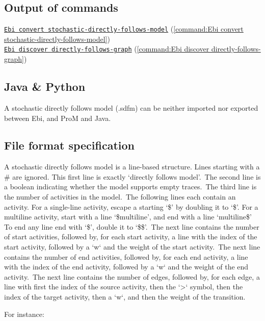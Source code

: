 {\subsection*{Output of commands} \null\qquad\hyperref[command:Ebi convert stochastic-directly-follows-model]{\texttt{Ebi convert stochastic-directly-follows-model}} (\cref{command:Ebi convert stochastic-directly-follows-model})\\\null\qquad\hyperref[command:Ebi discover directly-follows-graph]{\texttt{Ebi discover directly-follows-graph}} (\cref{command:Ebi discover directly-follows-graph})
\subsection*{Java \& Python}
A stochastic directly follows model (.sdfm) can be neither imported nor exported between Ebi, and ProM and Java.
\subsection*{File format specification}A stochastic directly follows model is a line-based structure. Lines starting with a \# are ignored.
    This first line is exactly `directly follows model'.\
    The second line is a boolean indicating whether the model supports empty traces.\
    The third line is the number of activities in the model.\
    The following lines each contain an activity. 
    For a single-line activity, escape a starting `\$' by doubling it to `\$'.
    For a multiline activity, start with a line `\$multiline', and end with a line `multiline\$'
    To end any line end with `\$', double it to `\$\$'.\
    The next line contains the number of start activities, followed by, for each start activity, a line with the index of the start activity, followed by a `w` and the weight of the start activity.\
    The next line contains the number of end activities, followed by, for each end activity, a line with the index of the end activity, followed by a `w` and the weight of the end activity.\
    The next line contains the number of edges, followed by, for each edge, a line with first the index of the source activity, then the `>` symbol, then the index of the target activity, then a `w`, and then the weight of the transition.
    
    For instance:
    
    
}
